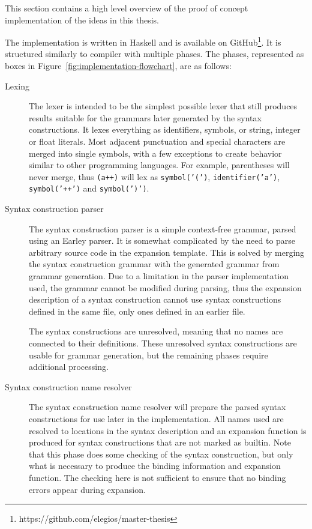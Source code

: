\documentclass{kththesis}
\begin{document}
This section contains a high level overview of the proof of concept implementation of the ideas in this thesis.

The implementation is written in Haskell and is available on GitHub\footnote{https://github.com/elegios/master-thesis}. It is structured similarly to compiler with multiple phases. The phases, represented as boxes in Figure~\ref{fig:implementation-flowchart}, are as follows:

\begin{description}
  \item[Lexing] The lexer is intended to be the simplest possible lexer that still produces results suitable for the grammars later generated by the syntax constructions. It lexes everything as identifiers, symbols, or string, integer or float literals. Most adjacent punctuation and special characters are merged into single symbols, with a few exceptions to create behavior similar to other programming languages. For example, parentheses will never merge, thus \texttt{(a++)} will lex as \texttt{symbol('(')}, \texttt{identifier('a')}, \texttt{symbol('++')} and \texttt{symbol(')')}.

  \item[Syntax construction parser] The syntax construction parser is a simple context-free grammar, parsed using an Earley \cite{Earley1970An-Efficient-Co} parser. It is somewhat complicated by the need to parse arbitrary source code in the expansion template. This is solved by merging the syntax construction grammar with the generated grammar from grammar generation. Due to a limitation in the parser implementation used, the grammar cannot be modified during parsing, thus the expansion description of a syntax construction cannot use syntax constructions defined in the same file, only ones defined in an earlier file.

  The syntax constructions are unresolved, meaning that no names are connected to their definitions. These unresolved syntax constructions are usable for grammar generation, but the remaining phases require additional processing.

  \item[Syntax construction name resolver] The syntax construction name resolver will prepare the parsed syntax constructions for use later in the implementation. All names used are resolved to locations in the syntax description and an expansion function is produced for syntax constructions that are not marked as builtin. Note that this phase does some checking of the syntax construction, but only what is necessary to produce the binding information and expansion function. The checking here is not sufficient to ensure that no binding errors appear during expansion.


\end{description}
\end{document}

